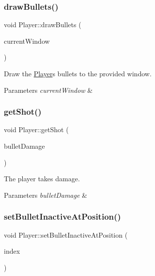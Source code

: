 \subsubsection{\texorpdfstring{draw\+Bullets()}{drawBullets()}}
{\footnotesize\ttfamily void Player\+::draw\+Bullets (\begin{DoxyParamCaption}\item[{sf\+::\+Render\+Window $\ast$}]{current\+Window }\end{DoxyParamCaption})}



Draw the \hyperlink{class_player}{Player}\textquotesingle{}s bullets to the provided window. 


\begin{DoxyParams}{Parameters}
{\em current\+Window} & \\
\hline
\end{DoxyParams}
\mbox{\label{class_player_a13e6164daf86c00800992d756339fe51}} 
\subsubsection{\texorpdfstring{get\+Shot()}{getShot()}}
{\footnotesize\ttfamily void Player\+::get\+Shot (\begin{DoxyParamCaption}\item[{int}]{bullet\+Damage }\end{DoxyParamCaption})}



The player takes damage. 


\begin{DoxyParams}{Parameters}
{\em bullet\+Damage} & \\
\hline
\end{DoxyParams}
\mbox{\label{class_player_a4a72b5ba696e55375ee614ef89a87ade}} 
\subsubsection{\texorpdfstring{set\+Bullet\+Inactive\+At\+Position()}{setBulletInactiveAtPosition()}}
{\footnotesize\ttfamily void Player\+::set\+Bullet\+Inactive\+At\+Position (\begin{DoxyParamCaption}\item[{int}]{index }\end{DoxyParamCaption})}



